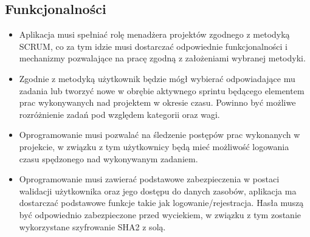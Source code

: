 \documentclass[12pt]{article}
\begin{document}
\subsection{Funkcjonalności}
\begin{itemize}
\item
Aplikacja musi spełniać rolę menadżera projektów zgodnego z metodyką SCRUM, co za tym idzie musi dostarczać odpowiednie funkcjonalności i mechanizmy pozwalające na pracę zgodną z założeniami wybranej metodyki. 
\item
Zgodnie z metodyką użytkownik będzie mógł wybierać odpowiadające mu zadania lub tworzyć nowe w obrębie aktywnego sprintu będącego elementem prac wykonywanych nad projektem w okresie czasu. Powinno być możliwe rozróżnienie zadań pod względem kategorii oraz wagi. 
\item
Oprogramowanie musi pozwalać na śledzenie postępów prac wykonanych w projekcie, w związku z tym użytkownicy będą mieć możliwość logowania czasu spędzonego nad wykonywanym zadaniem.
\item
Oprogramowanie musi zawierać podstawowe zabezpieczenia w postaci walidacji użytkownika oraz jego dostępu do danych zasobów, aplikacja ma dostarczać podstawowe funkcje takie jak logowanie/rejestracja. Hasła muszą być odpowiednio zabezpieczone przed wyciekiem, w związku z tym zostanie wykorzystane szyfrowanie SHA2 z solą. 


\end{itemize}
\end{document}
